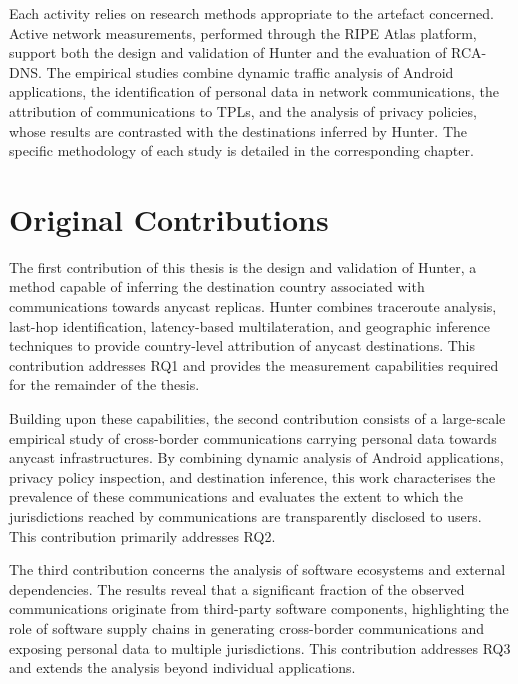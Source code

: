 Each activity relies on research methods appropriate to the artefact concerned. Active network measurements, performed through the RIPE Atlas platform, support both the design and validation of Hunter and the evaluation of RCA-DNS. The empirical studies combine dynamic traffic analysis of Android applications, the identification of personal data in network communications, the attribution of communications to TPLs, and the analysis of privacy policies, whose results are contrasted with the destinations inferred by Hunter. The specific methodology of each study is detailed in the corresponding chapter.

\section{Original Contributions}
\label{sc:introduction_contributions}

The first contribution of this thesis is the design and validation of Hunter, a method capable of inferring the destination country associated with communications towards anycast replicas. Hunter combines traceroute analysis, last-hop identification, latency-based multilateration, and geographic inference techniques to provide country-level attribution of anycast destinations. This contribution addresses RQ1 and provides the measurement capabilities required for the remainder of the thesis.

Building upon these capabilities, the second contribution consists of a large-scale empirical study of cross-border communications carrying personal data towards anycast infrastructures. By combining dynamic analysis of Android applications, privacy policy inspection, and destination inference, this work characterises the prevalence of these communications and evaluates the extent to which the jurisdictions reached by communications are transparently disclosed to users. This contribution primarily addresses RQ2.

The third contribution concerns the analysis of software ecosystems and external dependencies. The results reveal that a significant fraction of the observed communications originate from third-party software components, highlighting the role of software supply chains in generating cross-border communications and exposing personal data to multiple jurisdictions. This contribution addresses RQ3 and extends the analysis beyond individual applications.

